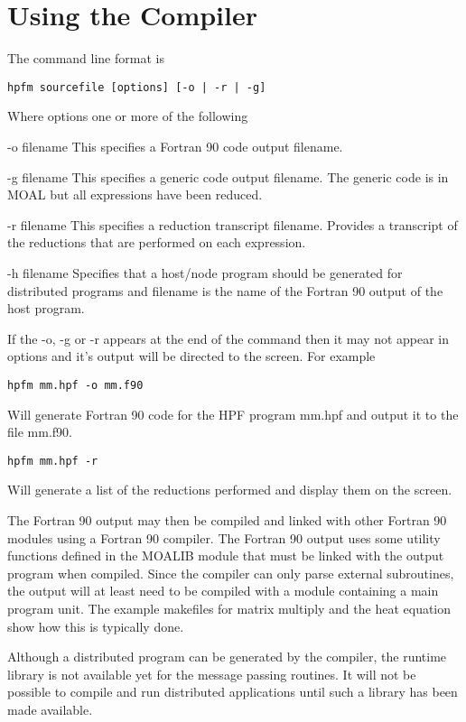 \section{Using the Compiler}
The command line format is
\begin{verbatim}
hpfm sourcefile [options] [-o | -r | -g]
\end{verbatim}
Where options one or more of the following
\begin{list}{}{}
\item[-o filename] This specifies a Fortran 90 code output filename.
\item[-g filename] This specifies a generic code output filename.  The generic
code is in MOAL but all expressions have been reduced.
\item[-r filename] This specifies a reduction transcript filename.  Provides
a transcript of the reductions that are performed on each expression.
\item[-h filename] Specifies that a host/node program should be generated
for distributed programs and filename is the name of the Fortran 90 output
of the host program.
\end{list}
If the -o, -g or -r appears at the end of the command then it may not appear
in options and it's output will be directed to the screen.  For example
\begin{verbatim}
hpfm mm.hpf -o mm.f90
\end{verbatim}
Will generate Fortran 90 code for the HPF program mm.hpf and output it to the 
file mm.f90.
\begin{verbatim}
hpfm mm.hpf -r
\end{verbatim}
Will generate a list of the reductions performed and display them on
the screen.

The Fortran 90 output may then be compiled and linked with other Fortran
90 modules using a Fortran 90 compiler.  The Fortran 90 output uses some
utility functions defined in the MOALIB module that must be linked with
the output program when compiled.  Since the compiler can only parse
external subroutines, the output will at least need to be compiled with
a module containing a main program unit.  The example makefiles for matrix 
multiply and the heat equation show how this is typically done.

Although a distributed program can be generated by the compiler, the
runtime library is not available yet for the message passing routines.
It will not be possible to compile and run distributed applications until
such a library has been made available.

